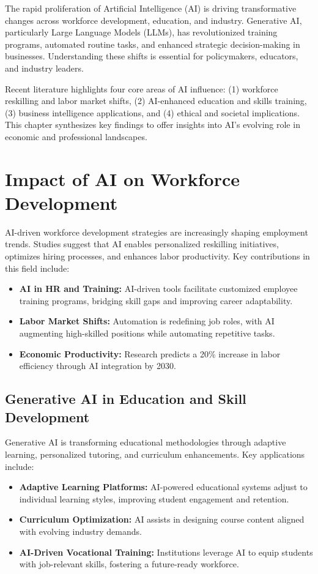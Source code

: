 \documentclass[a4paper,headinclude=on,footinclude=on,12pt,oneside]{scrbook}
\begin{document}


The rapid proliferation of Artificial Intelligence (AI) is driving transformative changes across workforce development, education, and industry. Generative AI, particularly Large Language Models (LLMs), has revolutionized training programs, automated routine tasks, and enhanced strategic decision-making in businesses. Understanding these shifts is essential for policymakers, educators, and industry leaders.

Recent literature highlights four core areas of AI influence: (1) workforce reskilling and labor market shifts, (2) AI-enhanced education and skills training, (3) business intelligence applications, and (4) ethical and societal implications. This chapter synthesizes key findings to offer insights into AI’s evolving role in economic and professional landscapes.

\section{Impact of AI on Workforce Development}

AI-driven workforce development strategies are increasingly shaping employment trends. Studies suggest that AI enables personalized reskilling initiatives, optimizes hiring processes, and enhances labor productivity. Key contributions in this field include:
\begin{itemize}
	\item \textbf{AI in HR and Training:} AI-driven tools facilitate customized employee training programs, bridging skill gaps and improving career adaptability.
	\item \textbf{Labor Market Shifts:} Automation is redefining job roles, with AI augmenting high-skilled positions while automating repetitive tasks.
	\item \textbf{Economic Productivity:} Research predicts a 20\% increase in labor efficiency through AI integration by 2030.
\end{itemize}

\subsection{Generative AI in Education and Skill Development}

Generative AI is transforming educational methodologies through adaptive learning, personalized tutoring, and curriculum enhancements. Key applications include:
\begin{itemize}
	\item \textbf{Adaptive Learning Platforms:} AI-powered educational systems adjust to individual learning styles, improving student engagement and retention.
	\item \textbf{Curriculum Optimization:} AI assists in designing course content aligned with evolving industry demands.
	\item \textbf{AI-Driven Vocational Training:} Institutions leverage AI to equip students with job-relevant skills, fostering a future-ready workforce.
\end{itemize}
\end{document}
